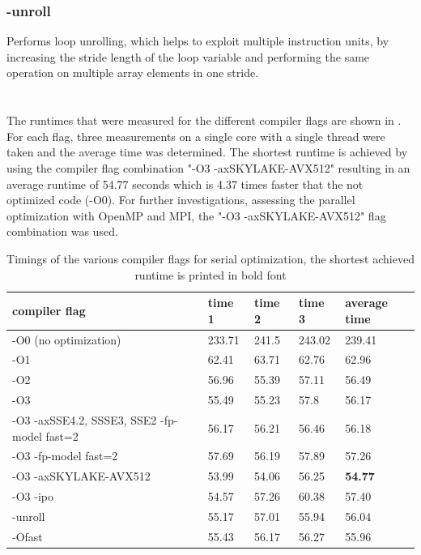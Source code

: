 \subsubsection*{-unroll}
Performs loop unrolling, which helps to exploit multiple instruction units, by increasing the stride length of the loop variable and performing the same operation on multiple array elements in one stride. 
\\
\citep{anmeyRWTHHPCClusterUser, behrLectureParallelComputing, QuickReferenceGuide, IntelCompilerClassic2022}
\\
\\
The runtimes that were measured for the different compiler flags are shown in . For each flag, three measurements on a single core with a single thread were taken and the average time was determined. The shortest runtime is achieved by using the compiler flag combination "-O3 -axSKYLAKE-AVX512" resulting in an average runtime of 54.77 seconds which is 4.37 times faster that the not optimized code (-O0). For further investigations, assessing the parallel optimization with OpenMP and MPI, the "-O3 -axSKYLAKE-AVX512" flag combination was used.

\renewcommand{\arraystretch}{2}
\begin{table}[h!]
	\begin{center}
		\begin{tabular}{| p{5cm} | p{1.5cm} p{1.5cm} p{1.5cm} | p{1.5cm} | }
			\hline
			compiler flag & time 1 & time 2 & time 3 & average time\\
			\hline
			-O0 (no optimization) & 233.71	& 241.5	& 243.02 & 239.41 \\
			\hline
			-O1 & 62.41	& 63.71	& 62.76	& 62.96\\
			\hline
			-O2 & 56.96	& 55.39	& 57.11	& 56.49\\
			\hline 
			-O3 & 55.49	& 55.23	& 57.8	& 56.17\\
			\hline
			-O3 -axSSE4.2, SSSE3, SSE2 -fp-model fast=2 & 56.17	& 56.21	& 56.46	& 56.18\\
			\hline
			-O3 -fp-model fast=2 & 57.69 & 56.19 & 57.89 & 57.26\\
			\hline
			-O3 -axSKYLAKE-AVX512 & 53.99 & 54.06 & 56.25 & \textbf{54.77}\\
			\hline
			-O3 -ipo & 54.57 & 57.26 & 60.38 & 57.40\\
			\hline
			-unroll & 55.17	& 57.01	& 55.94	& 56.04\\
			\hline
			-Ofast & 55.43	& 56.17	& 56.27	& 55.96\\
			\hline
		\end{tabular}
		\caption{\label{tab:SerialTimings}  Timings of the various compiler flags for serial optimization, the shortest achieved runtime is printed in bold font}
	\end{center}
\end{table}
\renewcommand{\arraystretch}{1}

